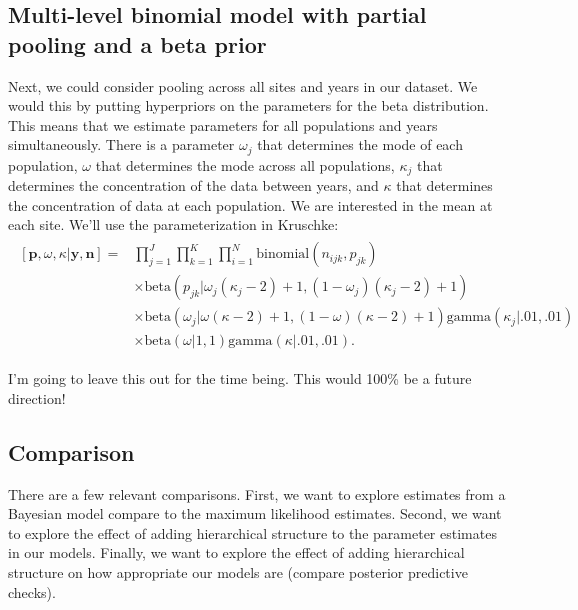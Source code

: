 \documentclass[12pt, oneside, titlepage]{article}   	%
\begin{document}
\subsection*{Multi-level binomial model with partial pooling and a beta prior}

Next, we could consider pooling across all sites and years in our dataset. We would this by putting hyperpriors on the parameters for the beta distribution. This means that we estimate parameters for all populations and years simultaneously. There is a parameter $\omega_j$ that determines the mode of each population, $\omega$ that determines the mode across all populations, $\kappa_j$ that determines the concentration of the data between years, and $\kappa$ that determines the concentration of data at each population. We are interested in the mean at each site. We'll use the parameterization in Kruschke:
%
\begin{align}
  \begin{split}
[\bm{p},\omega,\kappa|\bm{y},\bm{n}]  = & \prod_{j=1}^J \prod_{k=1}^K \prod_{i=1}^N \mathrm{binomial}(n_{ijk},p_{jk}) 
    \\ & \times \mathrm{beta} (  p_{jk} | \omega_j(\kappa_j-2) +1 , (1-\omega_j) (\kappa_j -2) + 1) 
    \\ & \times \mathrm{beta} ( \omega_j |  \omega(\kappa-2) +1 , (1-\omega) (\kappa -2) + 1) \mathrm{gamma} ( \kappa_j | .01, .01) 
    \\ & \times \mathrm{beta} ( \omega | 1 , 1 )  \mathrm{gamma} ( \kappa | .01, .01)  .
  \end{split}
\end{align}

I'm going to leave this out for the time being. This would 100\% be a future direction!
\fi



\subsection*{Comparison}

There are a few relevant comparisons. First, we want to explore estimates from a Bayesian model compare to the maximum likelihood estimates. Second, we want to explore the effect of adding hierarchical structure to the parameter estimates in our models. Finally, we want to explore the effect of adding hierarchical structure on how appropriate our models are (compare posterior predictive checks).
\end{document}
